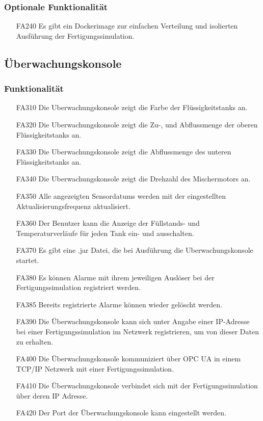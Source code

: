 \documentclass[parskip=full]{scrartcl}
\begin{document}
\subsubsection{Optionale Funktionalität}
\label{fertigung-optional}
\begin{enumerate}
\item[FA240] Es gibt ein \gls{Dockerimage} zur einfachen Verteilung und isolierten Ausführung der Fertigungssimulation.
\end{enumerate}

\subsection{Überwachungskonsole}
\subsubsection{Funktionalität}
\begin{enumerate}
\item[FA310] Die \gls{Uberwachungskonsole} zeigt die Farbe der Flüssigkeitstanks an.
\item[FA320] Die \gls{Uberwachungskonsole} zeigt die Zu-, und Abflussmenge der oberen Flüssigkeitstanks an.
\item[FA330] Die \gls{Uberwachungskonsole} zeigt die Abflussmenge des unteren Flüssigkeitstanks an.
\item[FA340] Die \gls{Uberwachungskonsole} zeigt die Drehzahl des Mischermotors an.
\item[FA350] Alle angezeigten \glspl{Sensordatum} werden mit der eingestellten Aktualisierungsfrequenz aktualisiert.
\item[FA360] Der Benutzer kann die Anzeige der Füllstands- und Temperaturverläufe für jeden Tank ein- und ausschalten.
\item[FA370] Es gibt eine .jar Datei, die bei Ausführung die \gls{Uberwachungskonsole} startet.
\item[FA380] Es k\"onnen Alarme mit ihrem jeweiligen Ausl\"oser bei der Fertigungssimulation registriert werden.
\item[FA385] Bereits registrierte Alarme k\"onnen wieder gel\"oscht werden.
\item[FA390] Die \"Uberwachungskonsole kann sich unter Angabe einer IP-Adresse bei einer Fertigungssimulation im Netzwerk
  registrieren, um von dieser Daten zu erhalten.
\item[FA400] Die Überwachungskonsole kommuniziert über OPC UA in einem TCP/IP Netzwerk mit einer Fertigungssimulation. 
\item[FA410] Die Überwachungskonsole verbindet sich mit der Fertigungssimulation über deren IP Adresse. 
\item[FA420] Der Port der Überwachungskonsole kann eingestellt werden.
\end{enumerate}
\end{document}
